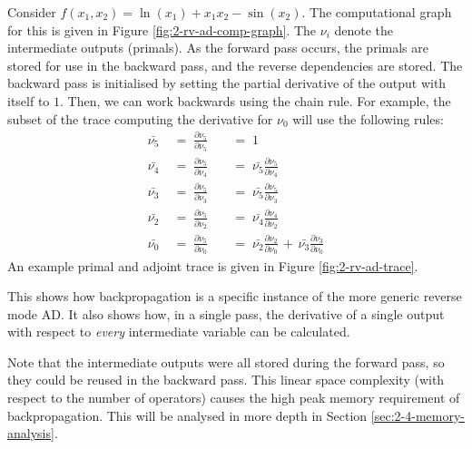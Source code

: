 Consider \(f(x_1, x_2) = \ln(x_1) + x_1x_2 - \sin(x_2)\).
The computational graph for this is given in Figure \ref{fig:2-rv-ad-comp-graph}.
The \(\nu_i\) denote the intermediate outputs (primals).
As the forward pass occurs, the primals are stored for use in the backward pass, and the reverse dependencies are stored.
The backward pass is initialised by setting the partial derivative of the output with itself to \(1\).
Then, we can work backwards using the chain rule.
For example, the subset of the trace computing the derivative for \(\nu_0\) will use the following rules:
\begin{align*}
    \bar{\nu_5} \;&=\; \frac{\partial \nu_5}{\partial \nu_5} \;&&=\; 1 \\[0.5em]
    \bar{\nu_4} \;&=\; \frac{\partial \nu_5}{\partial \nu_4} \;&&=\; \bar{\nu_5}\frac{\partial \nu_5}{\partial \nu_4} \\[0.5em]
    \bar{\nu_3} \;&=\; \frac{\partial \nu_5}{\partial \nu_3} \;&&=\; \bar{\nu_5}\frac{\partial \nu_5}{\partial \nu_3} \\[0.5em]
    \bar{\nu_2} \;&=\; \frac{\partial \nu_5}{\partial \nu_2} \;&&=\; \bar{\nu_4}\frac{\partial \nu_4}{\partial \nu_2} \\[0.5em]
    \bar{\nu_0} \;&=\; \frac{\partial \nu_5}{\partial \nu_0} \;&&=\; \bar{\nu_2}\frac{\partial \nu_2}{\partial \nu_0} \,+\, \bar{\nu_3}\frac{\partial \nu_3}{\partial \nu_0}
\end{align*}
An example primal and adjoint trace is given in Figure \ref{fig:2-rv-ad-trace}.

This shows how backpropagation is a specific instance of the more generic reverse mode AD.
It also shows how, in a single pass, the derivative of a single output with respect to \textit{every} intermediate variable can be calculated.

Note that the intermediate outputs were all stored during the forward pass, so they could be reused in the backward pass.
This linear space complexity (with respect to the number of operators) causes the high peak memory requirement of backpropagation.
This will be analysed in more depth in Section \ref{sec:2-4-memory-analysis}.
